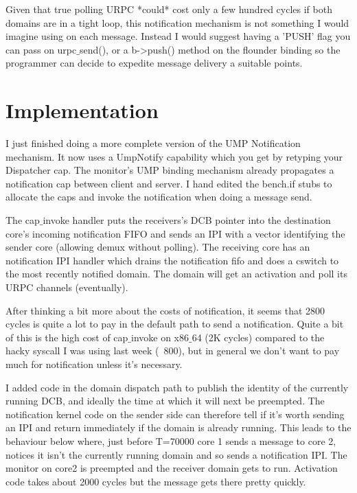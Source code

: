 \documentclass[a4paper,11pt,twoside]{report}
\begin{document}
Given that true polling URPC *could* cost only a few hundred cycles if
both domains are in a tight loop, this notification mechanism is not
something I would imagine using on each message. Instead I would
suggest having a 'PUSH' flag you can pass on urpc$\_$send(), or a
b->push() method on the flounder binding so the programmer can decide
to expedite message delivery a suitable points.

\chapter{Implementation}

I just finished doing a more complete version of the UMP Notification
mechanism.  It now uses a UmpNotify capability which you get by
retyping your Dispatcher cap.  The monitor's UMP binding mechanism
already propagates a notification cap between client and server.  I
hand edited the bench.if stubs to allocate the caps and invoke the
notification when doing a message send.

The cap$\_$invoke handler puts the receivers's DCB pointer into the
destination core's incoming notification FIFO and sends an IPI with a
vector identifying the sender core (allowing demux without polling).
The receiving core has an notification IPI handler which drains the
notification fifo and does a cswitch to the most recently notified
domain.  The domain will get an activation and poll its URPC channels
(eventually).

After thinking a bit more about the costs of notification, it seems
that 2800 cycles is quite a lot to pay in the default path to send a
notification.  Quite a bit of this is the high cost of cap$\_$invoke on
x86$\_$64 (2K cycles) compared to the hacky syscall I was using last week
(~800), but in general we don't want to pay much for notification
unless it's necessary.
  
I added code in the domain dispatch path to publish the identity of
the currently running DCB, and ideally the time at which it will next
be preempted.  The notification kernel code on the sender side can
therefore tell if it's worth sending an IPI and return immediately if
the domain is already running. This leads to the behaviour below
where, just before T=70000 core 1 sends a message to core 2, notices
it isn't the currently running domain and so sends a notification IPI.
The monitor on core2 is preempted and the receiver domain gets to run.
Activation code takes about 2000 cycles but the message gets there
pretty quickly.
\end{document}
